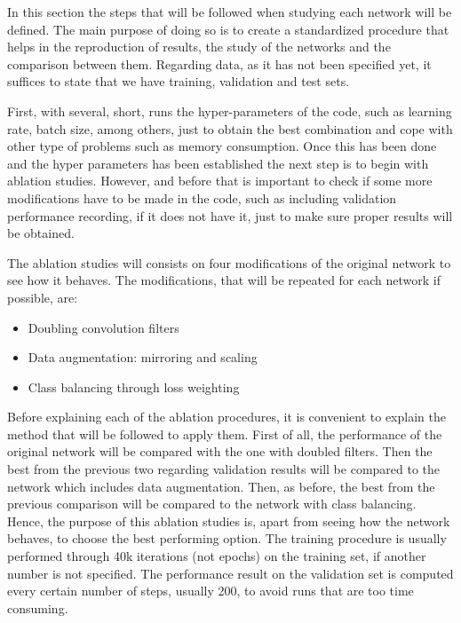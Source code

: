 \documentclass[12pt,a4paper]{article}
\begin{document}
In this section the steps that will be followed when studying each network will be defined. The main purpose of doing so is to create a standardized procedure that helps in the reproduction of results, the study of the networks and the comparison between them. Regarding data, as it has not been specified yet, it suffices to state that we have training, validation and test sets.\newline

First, with several, short, runs the hyper-parameters of the code, such as learning rate, batch size, among others, just to obtain the best combination and cope with other type of problems such as memory consumption. Once this has been done and the hyper parameters has been established the next step is to begin with ablation studies. However, and before that is important to check if some more modifications have to be made in the code, such as including validation performance recording, if it does not have it, just to make sure proper results will be obtained.\newline

The ablation studies will consists on four modifications of the original network to see how it behaves. The modifications, that will be repeated for each network if possible, are:

\begin{itemize}
\item Doubling convolution filters
\item Data augmentation: mirroring and scaling
\item Class balancing through loss weighting
\end{itemize}

Before explaining each of the ablation procedures, it is convenient to explain the method that will be followed to apply them. First of all, the performance of the original network will be compared with the one with doubled filters. Then the best from the previous two regarding validation results will be compared to the network which includes data augmentation. Then, as before, the best from the previous comparison will be compared to the network with class balancing. Hence, the purpose of this ablation studies is, apart from seeing how the network behaves, to choose the best performing option. The training procedure is usually performed through 40k iterations (not epochs) on the training set, if another number is not specified. The performance result on the validation set is computed every certain  number of steps, usually 200, to avoid runs that are too time consuming. \newline
\end{document}
